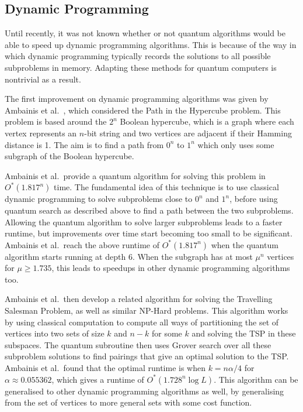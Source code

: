 \subsection{Dynamic Programming}
\label{ssec:q-dynamic}

Until recently, it was not known whether or not quantum algorithms would be able to speed up dynamic programming algorithms. This is because of the way in which dynamic programming typically records the solutions to all possible subproblems in memory. Adapting these methods for quantum computers is nontrivial as a result.

The first improvement on dynamic programming algorithms was given by Ambainis et al.\ \cite{ambainis2018}, which considered the Path in the Hypercube problem. This problem is based around the $2^n$ Boolean hypercube, which is a graph where each vertex represents an $n$-bit string and two vertices are adjacent if their Hamming distance is 1. The aim is to find a path from $0^n$ to $1^n$ which only uses some subgraph of the Boolean hypercube.

Ambainis et al.\ provide a quantum algorithm for solving this problem in $O^*(1.817^n)$ time. The fundamental idea of this technique is to use classical dynamic programming to solve subproblems close to $0^n$ and $1^n$, before using quantum search as described above to find a path between the two subproblems. Allowing the quantum algorithm to solve larger subproblems leads to a faster runtime, but improvements over time start becoming too small to be significant. Ambainis et al.\ reach the above runtime of $O^*(1.817^n)$ when the quantum algorithm starts running at depth $6$. When the subgraph has at most $\mu^n$ vertices for $\mu \geq 1.735$, this leads to speedups in other dynamic programming algorithms too.

Ambainis et al.\ then develop a related algorithm for solving the Travelling Salesman Problem, as well as similar NP-Hard problems. This algorithm works by using classical computation to compute all ways of partitioning the set of vertices into two sets of size $k$ and $n-k$ for some $k$ and solving the TSP in these subspaces. The quantum subroutine then uses Grover search over all these subproblem solutions to find pairings that give an optimal solution to the TSP. Ambainis et al.\ found that the optimal runtime is when $k=n\alpha/4$ for $\alpha\approx0.055362$, which gives a runtime of $O^*(1.728^n\log L)$. This algorithm can be generalised to other dynamic programming algorithms as well, by generalising from the set of vertices to more general sets with some cost function.

